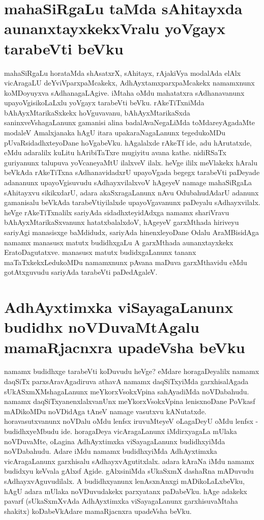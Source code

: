 \section*{mahaSiRgaLu taMda sAhitayxda aunanxtayxkekxVralu yoVgayx tarabeVti beVku}

mahaSiRgaLu horataMda shAsatxrX, sAhitayx, rAjakiVya modalAda elAlx vicAragaLU deYviVparxpaMcakekx, AdhAyxtamxparxpaMcakekx namamxnunx koMDoyuyxva sAdhanagaLAgive. iMtaha oMdu mahatatxra sAdhanavanunx upayoVgisikoLaLxlu yoVgayx tarabeVti beVku. rAkeTiTxniMda bAhAyxMtarikaSxkekx hoVguvavanu, bAhAyxMtarikaSxda saninxveVshagaLanunx gamanisi alina badalAvaNegaLiMda toMdareyAgadaMte modaleV Amalxjanaka hAgU itara upakaraNagaLanunx tegedukoMDu pUvaRsidadhxteyoDane hoVgabeVku. hAgalalxde rAkeTf ide, adu hArutatxde, eMdu adaralilx kuLitu hAribiTaTxre mugiyitu avana kathe. nidiRSaTx guriyanunx talupuva yoVcaneyaMtU ilalxveV ilalx. heVge ililx meVlakekx hAralu beVkAda rAkeTiTxna sAdhanavidadxrU upayoVgada begegx tarabeVti paDeyade adananunx upayoVgisuvudu sAdhayxvilalxvoV hAgeyeV namage mahaSiRgaLa sAhitayxvu sikikxdarU, adara akaSxragaLanunx nAvu OdubahudAdarU adanunx gamanisalu beVkAda tarabeVtiyilalxde upayoVgavanunx paDeyalu sAdhayxvilalx. heVge rAkeTiTxnalilx sariyAda sidadhxteyidAdxga namamx shariVravu bAhAyxMtarikaSxvanunx hatatxbalalxdoV, hAgeyeV garxMthada hiriveyu sariyAgi manasisxge baMdidudx, sariyAda hinenxleyoDane Odalu AraMBisidAga namamx manasusx matutx budidhxgaLu A garxMthada aunanxtayxkekx EratoDagutatxve. manasusx matutx budidxgaLanunx tananx maTaTxkekxLedukoMDu namamxnunx  pAvana maDuva garxMthavidu eMdu gotAtxguvudu sariyAda tarabeVti paDedAgaleV. 

\section*{AdhAyxtimxka viSayagaLanunx budidhx noVDuvaMtAgalu mamaRjacnxra upadeVsha beVku}

namamx budidhxge tarabeVti koDuvudu heVge? eMdare horagaDeyalilx namamx daqSiTx parxsAravAgadiruva athavA namamx daqSiTxyiMda garxhisalAgada sUkASxmXMshagaLanunx meYkorxVsokxVpina sahAyadiMda noVDabahudu. namamx daqSiTxyanenxlalxvanUnx meYkorxVsokxVpina lenisxnoDane PoVkasf mADikoMDu noVDidAga tAneV namage vasutxvu kANutatxde. horavasutxvanunx noVDalu oMdu lenfsx iruvuMteyeV oLagaDeyU oMdu lenfsx - budidhxyeMbudu ide. horagaDeya vicAragaLanunx iMdirxyagaLa mUlaka noVDuvaMte, oLagina AdhAyxtimxka viSayagaLanunx budidhxyiMda noVDabahudu. Adare iMdu namamx budidhxyiMda AdhAyxtimxka vicAragaLanunx garxhisalu sAdhayxvAgutitxlalx. adara kAraNa iMdu namamx budidxyu keVvala gAlxsf Agide. gAlxsiniMda sUkaSxmX dashaRna mADuvudu sAdhayxvAguvudilalx. A budidhxyanunx lenAsxnAnxgi mADikoLaLxbeVku, hAgU adara mUlaka noVDuvudakekx parxyatanx paDabeVku. hAge adakekx pavarf (sUkaSxmXvAda AdhAyxtimxka viSayagaLanunx garxhisuvaMtaha shakitx) koDabeVkAdare mamaRjacnxra upadeVsha beVku. 

